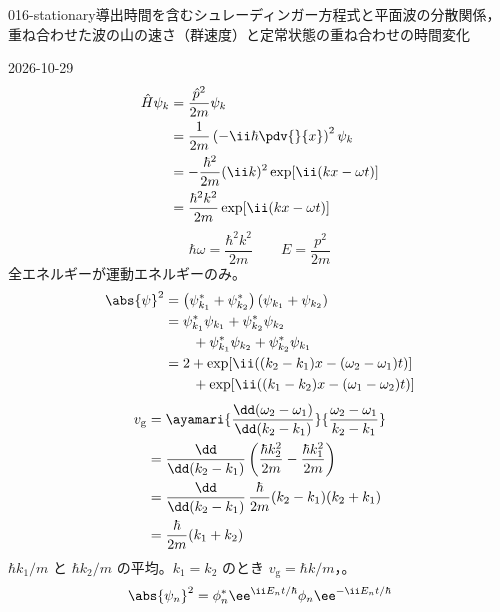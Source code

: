 \documentclass[uplatex,dvipdfmx,a4paper,11pt]{jsarticle}
\begin{document}
\begin{mondai}{016-stationary}{導出}{時間を含むシュレーディンガー方程式と平面波の分散関係，重ね合わせた波の山の速さ（群速度）と定常状態の重ね合わせの時間変化}
\begin{kotaeutsushi}{2026-10-29}
\begin{align*}
\hat{H}\psi_{k}&=\frac{\hat{p}^{2}}{2m}\psi_{k}\\
&=\frac{1}{2m}\left(-\ii\hbar\pdv{}{x}\right)^{2}\psi_{k}\\
&=-\frac{\hbar^{2}}{2m}(\ii k)^{2}\exp[\ii(kx-\omega t)]\\
&=\frac{\hbar^{2}k^{2}}{2m}\exp[\ii(kx-\omega t)]
\end{align*}
\[ \hbar\omega=\frac{\hbar^{2}k^{2}}{2m}\qquad E=\frac{p^{2}}{2m} \]
全エネルギーが運動エネルギーのみ。
\begin{align*}
\abs{\psi}^{2}&=\left(\psi_{k_{1}}^{*}+\psi_{k_{2}}^{*}\right)\left(\psi_{k_{1}}+\psi_{k_{2}}\right)\\
&=\psi_{k_{1}}^{*}\psi_{k_{1}}+\psi_{k_{2}}^{*}\psi_{k_{2}}\\
&\qquad+\psi_{k_{1}}^{*}\psi_{k_{2}}+\psi_{k_{2}}^{*}\psi_{k_{1}}\\
&=2+\exp[\ii((k_{2}-k_{1})x-(\omega_{2}-\omega_{1})t)]\\
&\qquad+\exp[\ii((k_{1}-k_{2})x-(\omega_{1}-\omega_{2})t)]
\end{align*}
\begin{align*}
v_{\mathrm{g}}&=\ayamari{\frac{\dd(\omega_{2}-\omega_{1})}{\dd(k_{2}-k_{1})}}{\frac{\omega_{2}-\omega_{1}}{k_{2}-k_{1}}}\\
&=\frac{\dd}{\dd(k_{2}-k_{1})}\left(\frac{\hbar k_{2}^{2}}{2m}-\frac{\hbar k_{1}^{2}}{2m}\right)\\
&=\frac{\dd}{\dd(k_{2}-k_{1})}\,\frac{\hbar}{2m}(k_{2}-k_{1})(k_{2}+k_{1})\\
&=\frac{\hbar}{2m}(k_{1}+k_{2})
\end{align*}
$\hbar k_{1}/m$ と $\hbar k_{2}/m$ の平均。$k_{1}=k_{2}$ のとき $v_{\mathrm{g}}=\hbar k/m$，。
\begin{align*}
\abs{\psi_{n}}^{2}&=\phi_{n}^{*}\ee^{\ii E_{n}t/\hbar}\phi_{n}\ee^{-\ii E_{n}t/\hbar}\\

\end{align*}
\end{kotaeutsushi}
\end{mondai}
\end{document}
